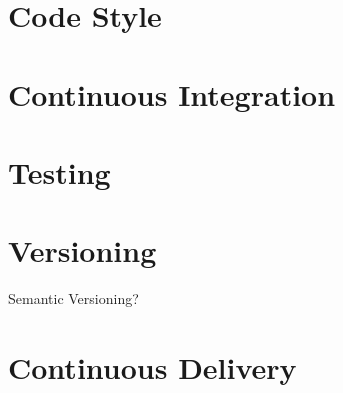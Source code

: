 \documentclass{article}
\begin{document}
	
	\section{Code Style}
	
	\section{Continuous Integration} 	
	\section{Testing}
	\section{Versioning}
	Semantic Versioning?
	\section{Continuous Delivery}
\end{document}
